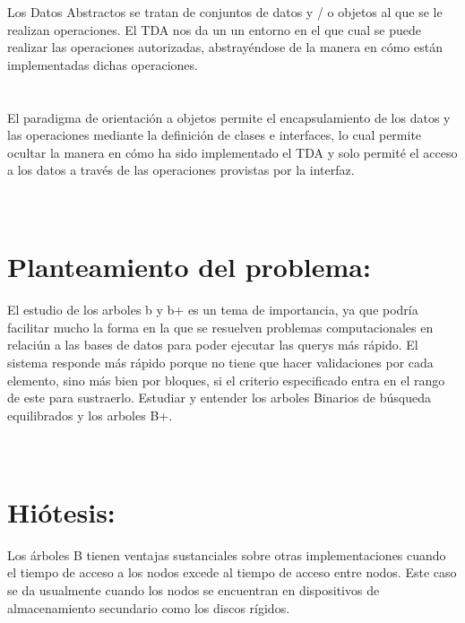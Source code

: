 \documentclass[11pt,a4paper]{report}
\begin{document}
Los Datos Abstractos se tratan de  conjuntos de datos y / o objetos al que se le realizan operaciones. El TDA nos da un   un entorno  en  el que  cual se puede realizar las operaciones autorizadas, abstray\'endose de la manera en c\'omo est\'an implementadas dichas operaciones.
\\
\\
\\
El paradigma de orientaci\'on a objetos permite el encapsulamiento de los datos y las operaciones mediante la definici\'on de clases e interfaces, lo cual permite ocultar la manera en c\'omo ha sido implementado el TDA y solo permit\'e el acceso a los datos a trav\'es de las operaciones provistas por la interfaz.
\\
\\
\\

\section{Planteamiento del problema:}

El estudio de los arboles b y b+   es un tema de importancia, ya que podr\'ia facilitar mucho la forma en la que se resuelven problemas computacionales en relaci\'un a las bases de datos para poder ejecutar las querys m\'as r\'apido. El sistema responde m\'as r\'apido porque no tiene que hacer validaciones por cada elemento, sino m\'as bien por bloques, si el criterio especificado entra en el rango de este para sustraerlo. 
Estudiar y entender los arboles Binarios de b\'usqueda equilibrados y los arboles B+.
\\
\\
\\
\section{Hi\'otesis:}
  Los \'arboles B tienen ventajas sustanciales sobre otras implementaciones cuando el tiempo de acceso a los nodos excede al tiempo de acceso entre nodos. Este caso se da usualmente cuando los nodos se encuentran en dispositivos de almacenamiento secundario como los discos r\'igidos.
 \\
\\
\\
\end{document}

